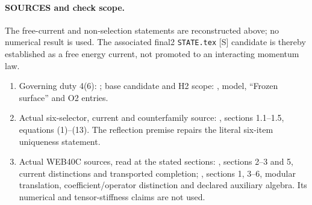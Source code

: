 \documentclass[10pt]{article}
\begin{document}
\paragraph{SOURCES and check scope.}
The free-current and non-selection statements are reconstructed
above; no numerical result is used. The associated final2
\texttt{STATE.tex} [S] candidate is thereby established as a free
energy current, not promoted to an interacting momentum law.
\begin{enumerate}
\item Governing duty 4(6):
;
base candidate and H2 scope:
, model,
``Frozen surface'' and O2 entries.
\item Actual six-selector, current and counterfamily source:
,
sections 1.1--1.5, equations (1)--(13). The reflection premise
repairs the literal six-item uniqueness statement.
\item Actual WEB40C sources, read at the stated sections:
,
sections 2--3 and 5, current distinctions and transported completion;
,
sections 1, 3--6, modular translation, coefficient/operator
distinction and declared auxiliary algebra. Its numerical and
tensor-stiffness claims are not used.
\end{enumerate}
\end{document}
